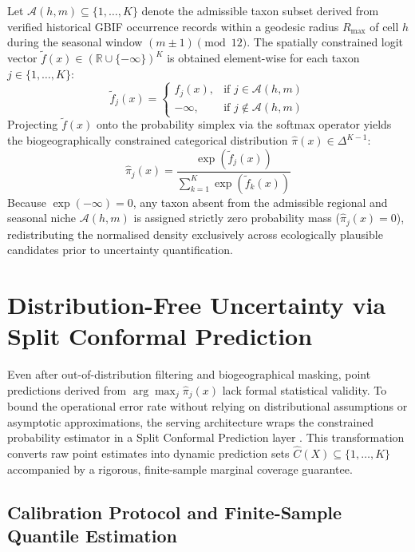 Let $\mathcal{A}(h, m) \subseteq \{1, \dots, K\}$ denote the admissible taxon subset derived from verified historical GBIF occurrence records within a geodesic radius $R_{\max}$ of cell $h$ during the seasonal window $(m \pm 1) \pmod{12}$. The spatially constrained logit vector $\tilde{f}(x) \in (\mathbb{R} \cup \{-\infty\})^K$ is obtained element-wise for each taxon $j \in \{1, \dots, K\}$:
\begin{equation}
\tilde{f}_j(x) = 
\begin{cases}
    f_j(x), & \text{if } j \in \mathcal{A}(h, m) \\
    -\infty, & \text{if } j \notin \mathcal{A}(h, m)
\end{cases}
\label{eq:spatial_mask}
\end{equation}
Projecting $\tilde{f}(x)$ onto the probability simplex via the softmax operator yields the biogeographically constrained categorical distribution $\hat{\pi}(x) \in \Delta^{K-1}$:
\begin{equation}
\hat{\pi}_j(x) = \frac{\exp(\tilde{f}_j(x))}{\sum_{k=1}^K \exp(\tilde{f}_k(x))}
\label{eq:constrained_softmax}
\end{equation}
Because $\exp(-\infty) = 0$, any taxon absent from the admissible regional and seasonal niche $\mathcal{A}(h, m)$ is assigned strictly zero probability mass ($\hat{\pi}_j(x) = 0$), redistributing the normalised density exclusively across ecologically plausible candidates prior to uncertainty quantification.

\section{Distribution-Free Uncertainty via Split Conformal Prediction}
\label{sec:conformal_prediction}

Even after out-of-distribution filtering and biogeographical masking, point predictions derived from $\arg\max_j \hat{\pi}_j(x)$ lack formal statistical validity. To bound the operational error rate without relying on distributional assumptions or asymptotic approximations, the serving architecture wraps the constrained probability estimator in a Split Conformal Prediction layer \cite{angelopoulos2021gentle}. This transformation converts raw point estimates into dynamic prediction sets $\hat{C}(X) \subseteq \{1, \dots, K\}$ accompanied by a rigorous, finite-sample marginal coverage guarantee.

\subsection{Calibration Protocol and Finite-Sample Quantile Estimation}
\label{subsec:conformal_calibration}

